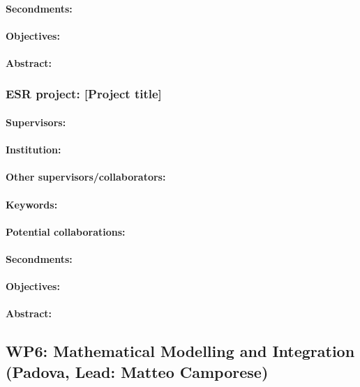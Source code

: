 \documentclass[12pt]{article}
\begin{document}
\paragraph{Secondments:} 
\paragraph{Objectives:} 
\paragraph{Abstract:} 

\subsubsection*{ESR project: [Project title]}
\paragraph{Supervisors:} 
\paragraph{Institution:} 
\paragraph{Other supervisors/collaborators:} 
\paragraph{Keywords:} 
\paragraph{Potential collaborations:} 
\paragraph{Secondments:} 
\paragraph{Objectives:} 
\paragraph{Abstract:} 

\subsection{WP6: Mathematical Modelling and Integration (Padova, Lead: Matteo Camporese)}
\end{document}
